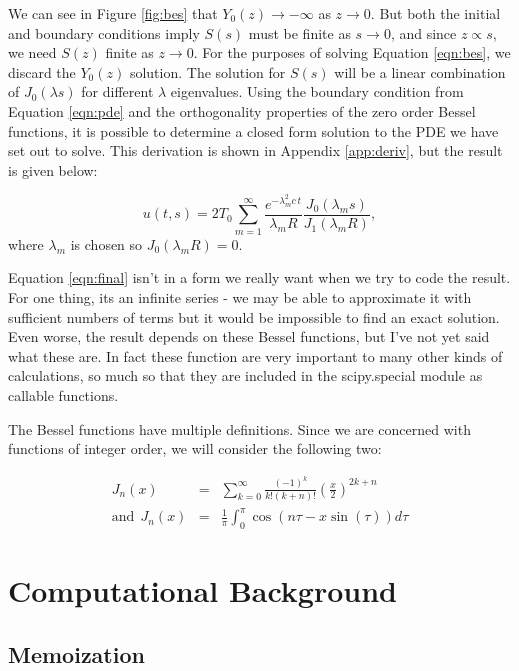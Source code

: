 \documentclass[a4paper,12pt]{article}
\begin{document}
We can see in Figure \ref{fig:bes} that $Y_0(z) \rightarrow -\infty$ as $z\rightarrow 0$. But both the initial and boundary conditions imply $S(s)$ must be finite as $s\rightarrow 0$, and since $z\propto s$, we need $S(z)$ finite as $z\rightarrow 0$. For the purposes of solving Equation \ref{eqn:bes}, we discard the $Y_0(z)$ solution. The solution for $S(s)$ will be a linear combination of $J_0(\lambda s)$ for different $\lambda$ eigenvalues. Using the boundary condition from Equation \ref{eqn:pde} and the orthogonality properties of the zero order Bessel functions, it is possible to determine a closed form solution to the PDE we have set out to solve. This derivation is shown in Appendix \ref{app:deriv}, but the result is given below:

\begin{equation}
u(t,s) = 2 T_0\sum_{m = 1}^{\infty}\frac{e^{-\lambda_m^2 c\,t}}{\lambda_m R}\frac{J_0(\lambda_m s)}{J_1(\lambda_m R)},
\label{eqn:final}
\end{equation}
%
where $\lambda_m$ is chosen so $J_0(\lambda_m R) = 0$.

Equation \ref{eqn:final} isn't in a form we really want when we try to code the result. For one thing, its an infinite series - we may be able to approximate it with sufficient numbers of terms but it would be impossible to find an exact solution. Even worse, the result depends on these Bessel functions, but I've not yet said what these are. In fact these function are very important to many other kinds of calculations, so much so that they are included in the scipy.special module as callable functions.

The Bessel functions have multiple definitions. Since we are concerned with functions of integer order, we will consider the following two:

\begin{eqnarray}
J_n(x) &=& \sum_{k=0}^{\infty}\frac{(-1)^k}{k!(k+n)!}\left(\frac{x}{2}\right)^{2k+n}\label{eqn:bessum}\\
\mathrm{and}\:\: J_n(x) &=& \frac{1}{\pi}\int_{0}^{\pi}\cos(n\tau - x\sin(\tau))d\tau
\label{eqn:besint}
\end{eqnarray}

\section{Computational Background}

\subsection{Memoization}
\end{document}
